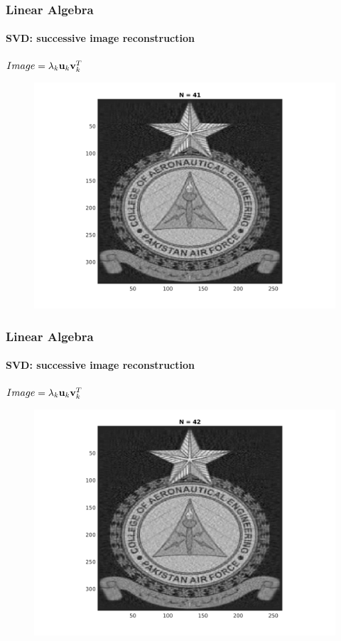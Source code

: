 \documentclass[hyperref={pdfpagelabels=true}]{beamer}
\begin{document}
\begin{frame}
\frametitle{Linear Algebra}
\framesubtitle{SVD: successive image reconstruction} 
\small{
\begin{center}
$Image = \lambda_k{\bf u}_k {\bf v}_k^T$
\end{center}}
\begin{figure}[!htb]
\centering
\includegraphics [scale=0.48]{n/b41.png}
\end{figure}
\end{frame}

\begin{frame}
\frametitle{Linear Algebra}
\framesubtitle{SVD: successive image reconstruction} 
\small{
\begin{center}
$Image = \lambda_k{\bf u}_k {\bf v}_k^T$
\end{center}}
\begin{figure}[!htb]
\centering
\includegraphics [scale=0.48]{n/b42.png}
\end{figure}
\end{frame}
\end{document}
